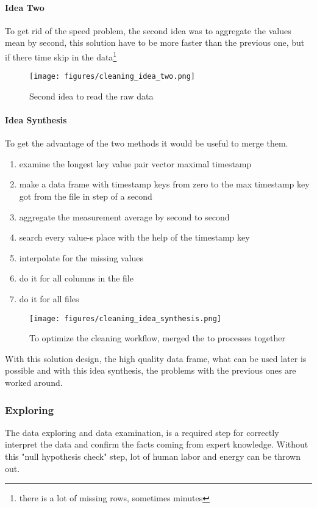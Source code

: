 		\paragraph{Idea Two}
To get rid of the speed problem, the second idea was to aggregate the values mean by second, this solution have to be more faster than the previous one, but if there time skip in the data\footnote{there is a lot of missing rows, sometimes minutes}
			\begin{figure}[!ht]
			\centering
			\texttt{[image: figures/cleaning\_idea\_two.png]}
			\caption{Second idea to read the raw data} 
			\end{figure}
		\paragraph{Idea Synthesis}
To get the advantage of the two methods it would be useful to merge them.
\begin{enumerate}
	\item{examine the longest key value pair vector maximal timestamp} 
	\item{make a data frame with timestamp keys from zero to the max timestamp key got from the file in step of a second}
	\item{aggregate the measurement average by second to second}
	\item{search every value-s place with the help of the timestamp key}
	\item{interpolate for the missing values}
	\item{do it for all columns in the file}
	\item{do it for all files}
\end{enumerate} 
			\begin{figure}[!ht]
			\centering
			\texttt{[image: figures/cleaning\_idea\_synthesis.png]}
			\caption{To optimize the cleaning workflow, merged the to processes together} 
			\end{figure}
\noindent
With this solution design, the high quality data frame, what can be used later is possible and with this idea synthesis, the problems with the previous ones are worked around.
	\subsubsection{Exploring}
	The data exploring and data examination, is a required step for correctly interpret the data and confirm the facts coming from expert knowledge. Without this "null hypothesis check" step, lot of human labor and energy can be thrown out.
